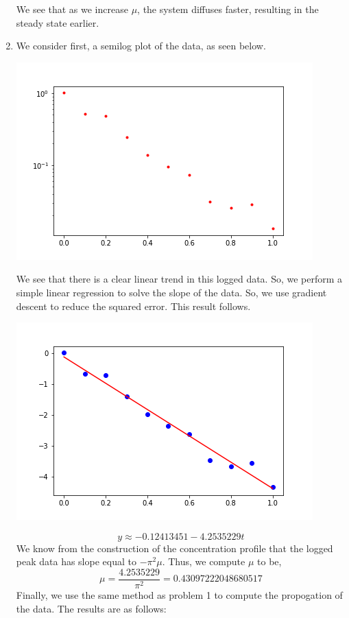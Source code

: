 \documentclass[letterpaper,10pt]{article}
\begin{document}
\begin{enumerate}
\begin{center}
\end{center}
We see that as we increase $\mu$, the system diffuses faster, resulting in the steady state earlier.
\item We consider first, a semilog plot of the data, as seen below.
\begin{center}
\includegraphics[scale=.5]{semilog.png}
\end{center}
We see that there is a clear linear trend in this logged data. So, we perform a simple linear regression to solve the slope of the data. So, we use gradient descent to reduce the squared error. This result follows.
\begin{center}
\includegraphics[scale=.5]{descentresults.png}
\end{center}
\[y\approx -0.12413451-4.2535229t\]
We know from the construction of the concentration profile that the logged peak data has slope equal to $-\pi^2\mu$. Thus, we compute $\mu$ to be,
\[\mu=\frac{4.2535229}{\pi^2}=0.43097222048680517\]
Finally, we use the same method as problem 1 to compute the propogation of the data. The results are as follows:
\begin{center}

\end{center}
\end{enumerate}
\end{document}

